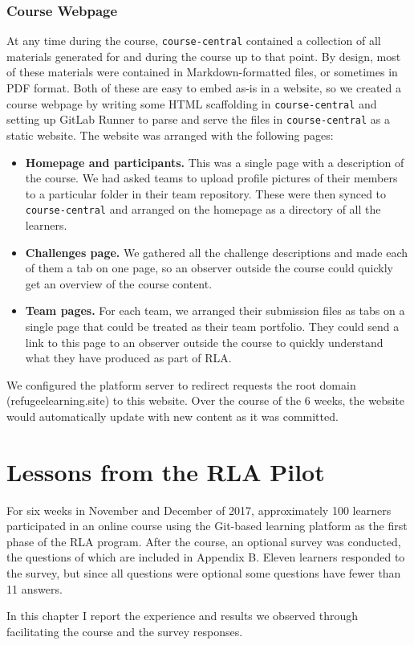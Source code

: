 \documentclass[12pt,twoside]{mitthesis}
\newcommand{\review}[1]{{\color{mygreen} #1}}
\begin{document}
\subsection{Course Webpage}

\review{At any time during the course, \texttt{course-central} contained a collection of all materials generated for and during the course up to that point. By design, most of these materials were contained in Markdown-formatted files, or sometimes in PDF format. Both of these are easy to embed as-is in a website, so we created a course webpage by writing some HTML scaffolding in \texttt{course-central} and setting up GitLab Runner to parse and serve the files in \texttt{course-central} as a static website. The website was arranged with the following pages:
\begin{itemize}
\item \textbf{Homepage and participants.} This was a single page with a description of the course. We had asked teams to upload profile pictures of their members to a particular folder in their team repository. These were then synced to \texttt{course-central} and arranged on the homepage as a directory of all the learners.
\item \textbf{Challenges page.} We gathered all the challenge descriptions and made each of them a tab on one page, so an observer outside the course could quickly get an overview of the course content.
\item \textbf{Team pages.} For each team, we arranged their submission files as tabs on a single page that could be treated as their team portfolio. They could send a link to this page to an observer outside the course to quickly understand what they have produced as part of RLA.
\end{itemize}
We configured the platform server to redirect requests the root domain (refugeelearning.site) to this website. Over the course of the 6 weeks, the website would automatically update with new content as it was committed.
}

\chapter{Lessons from the RLA Pilot}

\review{For six weeks in November and December of 2017, approximately 100 learners participated in an online course using the Git-based learning platform as the first phase of the RLA program. After the course, an optional survey was conducted, the questions of which are included in Appendix B. Eleven learners responded to the survey, but since all questions were optional some questions have fewer than 11 answers.

In this chapter I report the experience and results we observed through facilitating the course and the survey responses.}
\end{document}
